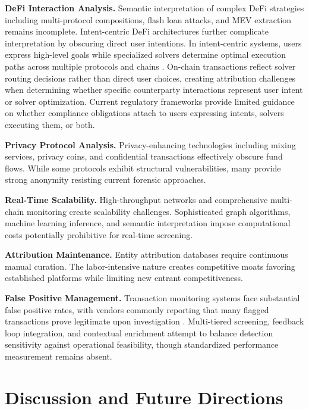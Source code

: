\documentclass[conference,compsoc]{IEEEtran}
\begin{document}
\noindent\textbf{DeFi Interaction Analysis.}
Semantic interpretation of complex DeFi strategies including multi-protocol compositions, flash loan attacks, and MEV extraction remains incomplete. Intent-centric DeFi architectures further complicate interpretation by obscuring direct user intentions. In intent-centric systems, users express high-level goals while specialized solvers determine optimal execution paths across multiple protocols and chains \cite{mao2025motivationexecutiongrounded}. On-chain transactions reflect solver routing decisions rather than direct user choices, creating attribution challenges when determining whether specific counterparty interactions represent user intent or solver optimization. Current regulatory frameworks provide limited guidance on whether compliance obligations attach to users expressing intents, solvers executing them, or both.

\noindent\textbf{Privacy Protocol Analysis.} 
Privacy-enhancing technologies including mixing services, privacy coins, and confidential transactions effectively obscure fund flows. While some protocols exhibit structural vulnerabilities, many provide strong anonymity resisting current forensic approaches.

\noindent\textbf{Real-Time Scalability.} 
High-throughput networks and comprehensive multi-chain monitoring create scalability challenges. Sophisticated graph algorithms, machine learning inference, and semantic interpretation impose computational costs potentially prohibitive for real-time screening.

\noindent\textbf{Attribution Maintenance.} 
Entity attribution databases require continuous manual curation. The labor-intensive nature creates competitive moats favoring established platforms while limiting new entrant competitiveness.

\noindent\textbf{False Positive Management.} 
Transaction monitoring systems face substantial false positive rates, with vendors commonly reporting that many flagged transactions prove legitimate upon investigation \cite{alotibi2022moneylaunderingdetection}. Multi-tiered screening, feedback loop integration, and contextual enrichment attempt to balance detection sensitivity against operational feasibility, though standardized performance measurement remains absent.



\section{Discussion and Future Directions}
\label{sec:discussion}
\end{document}
